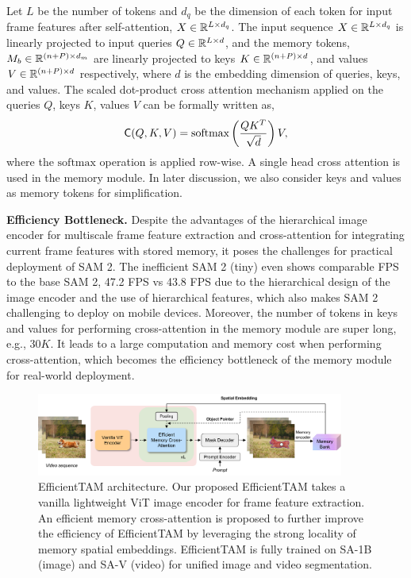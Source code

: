 Let $L$ be the number of tokens and $d_q$ be the dimension of each token for input frame features after self-attention, $X \in \mathbb{R}^{L \times d_q}$. The input sequence $X \in \mathbb{R}^{L \times d_q}$ is linearly projected to input queries $Q \in \mathbb{R}^{L\times d}$, and the memory tokens, $M_{b} \in \mathbb{R}^{(n+P)\times d_m}$ are linearly projected to keys $K \in \mathbb{R}^{(n+P) \times d}$, and values $V \in \mathbb{R}^{(n+P) \times d}$ respectively, where $d$ is the embedding dimension of queries, keys, and values. The scaled dot-product cross attention mechanism applied on the queries $Q$, keys $K$, values $V$ can be formally written as, 
\begin{equation}\label{eq:crossattn}
     \textsf{C}(Q, K, V) =  \text{softmax}\left(\frac{QK^T}{\sqrt{d}}\right) V,
\end{equation}
where the $\text{softmax}$ operation is applied row-wise. A single head cross attention is used in the memory module. In later discussion, we also consider keys and values as memory tokens for simplification. 

\noindent \textbf{Efficiency Bottleneck.} Despite the advantages of the hierarchical image encoder for multiscale frame feature extraction and cross-attention for integrating current frame features with stored memory, it poses the challenges for practical deployment of SAM 2. The inefficient SAM 2 (tiny) even shows comparable FPS to the base SAM 2, 47.2 FPS vs 43.8 FPS due to the hierarchical design of the image encoder and the use of hierarchical features, which also makes SAM 2 challenging to deploy on mobile devices. Moreover, the number of tokens in keys and values for performing cross-attention in the memory module are super long, e.g., $30K$. It leads to a large computation and memory cost when performing cross-attention, which becomes the efficiency bottleneck of the memory module for real-world deployment. 

\begin{figure}[t]
    \centering
    \includegraphics[width=0.9\textwidth]{figures/arch.pdf}
    \caption{EfficientTAM architecture. Our proposed EfficientTAM takes a vanilla lightweight ViT image encoder for frame feature extraction. An efficient memory cross-attention is proposed to further improve the efficiency of EfficientTAM by leveraging the strong locality of memory spatial embeddings. EfficientTAM is fully trained on SA-1B (image) and SA-V (video) for unified image and video segmentation.}
    \label{fig:efficienttams}
\end{figure}

